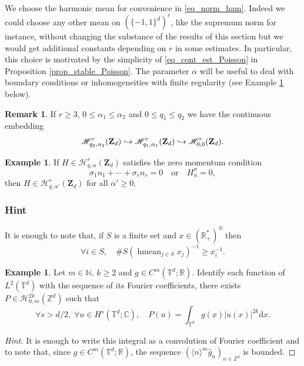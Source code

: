 \documentclass[JEP,XML,SOM,Unicode,NoEqCountersInSection,published]{cedram}
\newcommand\hto{\mathrel{\lhook\joinrel\to}}
\theoremstyle{definition}
\newtheorem{remark}[theorem]{Remark}
\newtheorem{example}[theorem]{Example}
\begin{document}
We choose the harmonic mean for convenience in \eqref{eq_norm_ham}. Indeed we could choose any other mean on $(\{-1,1\}^d)^r$, like the supremum norm for instance, without changing the substance of the results of this section but we would get additional constants depending on $r$ in some estimates. In particular, this choice is motivated by the simplicity of \eqref{eq_cont_est_Poisson} in Proposition \ref{prop_stable_Poisson}. The parameter $\alpha$ will be useful to deal with boundary conditions or inhomogeneities with finite regularity (see Example \ref{example:m} below).

\begin{remark} If $r\geq 3$, $0\leq \alpha_1 \leq \alpha_2 $ and $0\leq q_1 \leq q_2 $ we have the continuous embedding\vspace*{-3pt}
\[
\mathscr{H}_{q_2,\alpha_2}^{r}(\mathbf{Z}_d) \hto \mathscr{H}_{q_1,\alpha_1}^{r}(\mathbf{Z}_d) \hto \mathscr{H}_{0,0}^{r}(\mathbf{Z}_d).
\]
\end{remark}

\begin{example} If $H\in \mathscr{H}_{q,\alpha}^{r}(\mathbf{Z}_d)$ satisfies the zero momentum condition
\[
\sigma_1 n_1+ \cdots+ \sigma_r n_r = 0 \quad \mathrm{or} \quad H_{n}^{\sigma}=0,
\]
then $H\in \mathscr{H}_{q,\alpha'}^{r}(\mathbf{Z}_d)$ for all $\alpha'\geq 0$.
\subsubsection*{Hint}
It is enough to note that, if $S$ is a finite set and $x\in (\mathbb{R}_+^*)^S$ then
\[
\forall i\in S, \quad \# S (\mathop{\mathrm{hmean}}_{j\in S} x_j)^{-1} \geq x_{i}^{-1}.
\]
\end{example}

\begin{example}\label{example:m} Let $m\in \mathbb{N}$, $k\geq 2$ and $g\in C^m(\mathbb{T}^d;\mathbb{R})$. Identify each function of $L^2(\mathbb{T}^d)$ with the sequence of its Fourier coefficients, there exists $P\in \mathscr{H}_{0,m}^{2k}(\mathbb{Z}^d)$ such that
\[
\forall s>d/2,\;\forall u\in H^s(\mathbb{T}^d;\mathbb{C}), \quad P(u) = \int_{\mathbb{T}^d} g(x) |u(x)|^{2k} \mathrm{d}x.
\]
\begin{proof}[Hint]
It is enough to write this integral as a convolution of Fourier coefficient and to note that, since $g\in C^m(\mathbb{T}^d;\mathbb{R})$, the sequence $(\langle n\rangle^m \widehat{g}_n)_{n\in \mathbb{Z}^d}$ is bounded.\skipqed
\end{proof}
\end{example}
\end{document}
